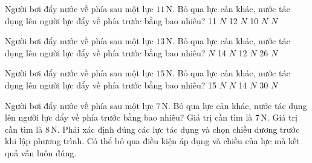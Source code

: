 \begin{ex}
Người bơi đẩy nước về phía sau một lực $11\,\text{N}$. Bỏ qua lực cản khác, nước tác dụng lên người lực đẩy về phía trước bằng bao nhiêu?
\choice
{11 $N$}
{12 $N$}
{10 $N$}
{ $N$}
\end{ex}

\begin{ex}
Người bơi đẩy nước về phía sau một lực $13\,\text{N}$. Bỏ qua lực cản khác, nước tác dụng lên người lực đẩy về phía trước bằng bao nhiêu?
\choice
{ $N$}
{14 $N$}
{12 $N$}
{26 $N$}
\end{ex}

\begin{ex}
Người bơi đẩy nước về phía sau một lực $15\,\text{N}$. Bỏ qua lực cản khác, nước tác dụng lên người lực đẩy về phía trước bằng bao nhiêu?
\choice
{15 $N$}
{ $N$}
{14 $N$}
{30 $N$}
\end{ex}

\begin{ex}
Người bơi đẩy nước về phía sau một lực $7\,\text{N}$. Bỏ qua lực cản khác, nước tác dụng lên người lực đẩy về phía trước bằng bao nhiêu?
\choiceTF
{\True Giá trị cần tìm là $7\,\text{N}$.}
{Giá trị cần tìm là $8\,\text{N}$.}
{\True Phải xác định đúng các lực tác dụng và chọn chiều dương trước khi lập phương trình.}
{Có thể bỏ qua điều kiện áp dụng và chiều của lực mà kết quả vẫn luôn đúng.}
\end{ex}

